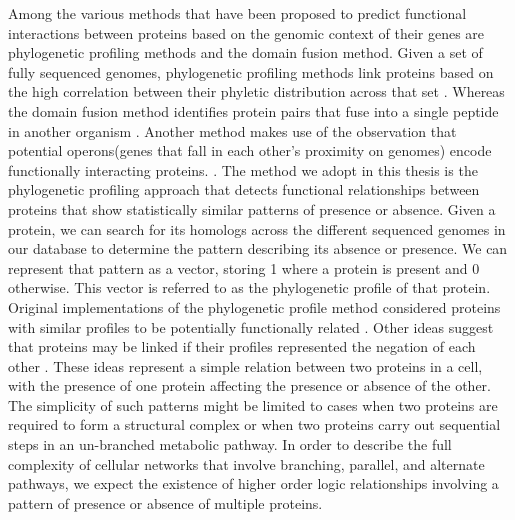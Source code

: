\documentclass{ucetd}
\begin{document}
Among the various methods that have been proposed to predict functional interactions between proteins based on the genomic context of their genes are phylogenetic profiling methods and the domain fusion method\cite{5}. Given a set of fully sequenced genomes, phylogenetic profiling methods link proteins based on the high correlation between their phyletic distribution across that set \cite{29, 30, 31}. Whereas the domain fusion method identifies protein pairs that fuse into a single peptide in another organism \cite{8, 32, 33}.  Another method makes use of the observation that potential operons(genes that fall in each other's proximity on genomes) encode functionally interacting proteins. \cite{2, 35,36,37,38,39}.  The method we adopt in this thesis is the phylogenetic profiling approach \cite{1, 40, 41, 42} that detects functional relationships between proteins that show statistically similar patterns of presence or absence. Given a protein, we can search for its homologs across the different sequenced genomes in our database to determine the pattern describing its absence or presence. We can represent that pattern as a vector, storing 1 where a protein is present and 0 otherwise. This vector is referred to as the phylogenetic profile of that protein. Original implementations of the phylogenetic profile method considered proteins with similar profiles to be potentially functionally related \cite{40}.  Other ideas suggest that proteins may be linked if their profiles represented the negation of each other \cite{43, 44}. 
These ideas represent a simple relation between two proteins in a cell, with the presence of one protein affecting the presence or absence of the other. The simplicity of such patterns might be limited to cases when two proteins are required to form a structural complex or when two proteins carry out sequential steps in an un-branched metabolic pathway. In order to describe the full complexity of cellular networks that involve branching, parallel, and alternate pathways, we expect the existence of higher order logic relationships involving a pattern of presence or absence of multiple proteins\cite{1}.
\end{document}
